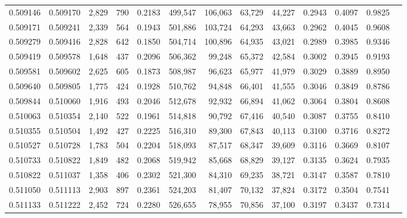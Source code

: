 \begin{tabular}{rrrrrrrrrrrrr}
0.509146 & 0.509170 &  2,829 &   790 &                                     0.2183 & 499,547 & 106,063 &  63,729 &  44,227 & 0.2943 & 0.4097 & 0.9825 \\
0.509171 & 0.509241 &  2,339 &   564 &                                     0.1943 & 501,886 & 103,724 &  64,293 &  43,663 & 0.2962 & 0.4045 & 0.9608 \\
0.509279 & 0.509416 &  2,828 &   642 &                                     0.1850 & 504,714 & 100,896 &  64,935 &  43,021 & 0.2989 & 0.3985 & 0.9346 \\
0.509419 & 0.509578 &  1,648 &   437 &                                     0.2096 & 506,362 &  99,248 &  65,372 &  42,584 & 0.3002 & 0.3945 & 0.9193 \\
0.509581 & 0.509602 &  2,625 &   605 &                                     0.1873 & 508,987 &  96,623 &  65,977 &  41,979 & 0.3029 & 0.3889 & 0.8950 \\
0.509640 & 0.509805 &  1,775 &   424 &                                     0.1928 & 510,762 &  94,848 &  66,401 &  41,555 & 0.3046 & 0.3849 & 0.8786 \\
0.509844 & 0.510060 &  1,916 &   493 &                                     0.2046 & 512,678 &  92,932 &  66,894 &  41,062 & 0.3064 & 0.3804 & 0.8608 \\
0.510063 & 0.510354 &  2,140 &   522 &                                     0.1961 & 514,818 &  90,792 &  67,416 &  40,540 & 0.3087 & 0.3755 & 0.8410 \\
0.510355 & 0.510504 &  1,492 &   427 &                                     0.2225 & 516,310 &  89,300 &  67,843 &  40,113 & 0.3100 & 0.3716 & 0.8272 \\
0.510527 & 0.510728 &  1,783 &   504 &                                     0.2204 & 518,093 &  87,517 &  68,347 &  39,609 & 0.3116 & 0.3669 & 0.8107 \\
0.510733 & 0.510822 &  1,849 &   482 &                                     0.2068 & 519,942 &  85,668 &  68,829 &  39,127 & 0.3135 & 0.3624 & 0.7935 \\
0.510822 & 0.511037 &  1,358 &   406 &                                     0.2302 & 521,300 &  84,310 &  69,235 &  38,721 & 0.3147 & 0.3587 & 0.7810 \\
0.511050 & 0.511113 &  2,903 &   897 &                                     0.2361 & 524,203 &  81,407 &  70,132 &  37,824 & 0.3172 & 0.3504 & 0.7541 \\
0.511133 & 0.511222 &  2,452 &   724 &                                     0.2280 & 526,655 &  78,955 &  70,856 &  37,100 & 0.3197 & 0.3437 & 0.7314 \\

\end{tabular}
